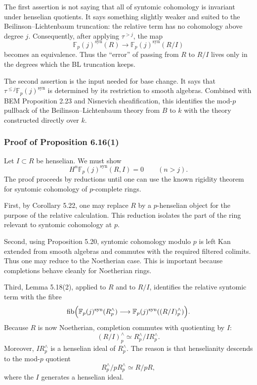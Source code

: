 \documentclass[11pt,a4paper]{article}
\newcommand{\F}{\mathbb F}
\newcommand{\syn}{\mathrm{syn}}
\newcommand{\fib}{\mathrm{fib}}
\newcommand{\1}{\mathbf 1}
\theoremstyle{bemstyle}
\theoremstyle{definition}
\begin{document}
The first assertion is not saying that all of syntomic cohomology is invariant under henselian quotients. It says something slightly weaker and suited to the Beilinson--Lichtenbaum truncation: the relative term has no cohomology above degree \(j\). Consequently, after applying \(\tau^{>j}\), the map
\[
  \F_p(j)^{\syn}(R)\longrightarrow \F_p(j)^{\syn}(R/I)
\]
becomes an equivalence. Thus the ``error'' of passing from \(R\) to \(R/I\) lives only in the degrees which the BL truncation keeps.

The second assertion is the input needed for base change. It says that \(\tau^{\leq j}\F_p(j)^{\syn}\) is determined by its restriction to smooth algebras. Combined with BEM Proposition 2.23 and Nisnevich sheafification, this identifies the mod-\(p\) pullback of the Beilinson--Lichtenbaum theory from \(B\) to \(k\) with the theory constructed directly over \(k\).

\subsubsection{Proof of Proposition 6.16(1)}

Let \(I\subset R\) be henselian. We must show
\[
  H^n\F_p(j)^{\syn}(R,I)=0\qquad (n>j).
\]
The proof proceeds by reductions until one can use the known rigidity theorem for syntomic cohomology of \(p\)-complete rings.

First, by Corollary 5.22, one may replace \(R\) by a \(p\)-henselian object for the purpose of the relative calculation. This reduction isolates the part of the ring relevant to syntomic cohomology at \(p\).

Second, using Proposition 5.20, syntomic cohomology modulo \(p\) is left Kan extended from smooth algebras and commutes with the required filtered colimits. Thus one may reduce to the Noetherian case. This is important because completions behave cleanly for Noetherian rings.

Third, Lemma 5.18(2), applied to \(R\) and to \(R/I\), identifies the relative syntomic term with the fibre
\[
  \fib\Bigl(
    \F_p(j)^{\syn}(R^\wedge_p)
    \longrightarrow
    \F_p(j)^{\syn}((R/I)^\wedge_p)
  \Bigr).
\]
Because \(R\) is now Noetherian, completion commutes with quotienting by \(I\):
\[
  (R/I)^\wedge_p\simeq R^\wedge_p/IR^\wedge_p.
\]
Moreover, \(IR^\wedge_p\) is a henselian ideal of \(R^\wedge_p\). The reason is that henselianity descends to the mod-\(p\) quotient
\[
  R^\wedge_p/pR^\wedge_p\simeq R/pR,
\]
where the \(I\) generates a henselian ideal.
\end{document}
